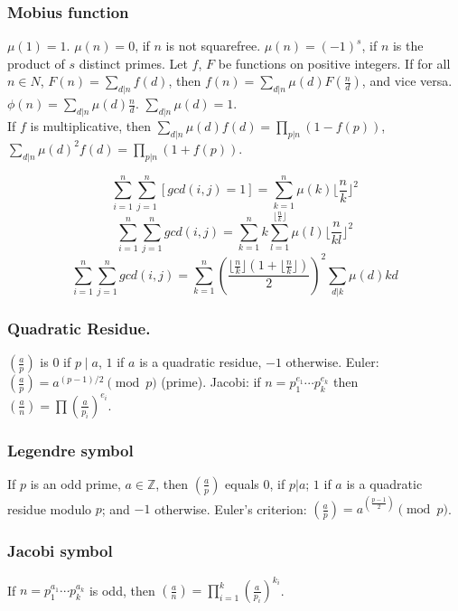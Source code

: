 \begin{small}
\subsubsection{Mobius function}
$\mu(1) = 1$. $\mu(n) = 0$, if $n$ is not squarefree.
$\mu(n) = (-1)^s$, if $n$ is the product of $s$ distinct primes.
Let $f$, $F$ be functions on positive integers.
If for all $n \in N$, $F(n)=\sum_{d|n} f(d)$, then $f(n) = \sum_{d|n} \mu(d) F(\frac{n}{d})$,
and vice versa. \quad
$\phi(n) = \sum_{d|n} \mu(d) \frac{n}{d}$.
\quad $\sum_{d|n} \mu(d) = 1$. \\
If $f$ is multiplicative, then $\sum_{d|n} \mu(d) f(d) = \prod_{p|n}(1-f(p))$,
$\sum_{d|n} \mu(d)^2 f(d) = \prod_{p|n} (1+f(p))$.
\begin{itemize}[noitemsep]
  $$ \sum_{i = 1}^n \sum_{j = 1}^n [gcd(i, j) = 1] = \sum_{k = 1}^n \mu(k) \lfloor \frac{n}{k} \rfloor^2 $$
  $$ \sum_{i = 1}^n \sum_{j = 1}^n gcd(i, j) = \sum_{k = 1}^n k \sum_{l = 1}^{\lfloor \frac{n}{k} \rfloor} \mu(l) \lfloor {\frac{n}{kl}} \rfloor^2 $$
  $$ \sum_{i = 1}^n \sum_{j = 1}^n gcd(i, j) = \sum_{k = 1}^n (\frac{\lfloor \frac{n}{k} \rfloor (1 + \lfloor \frac{n}{k} \rfloor) }{2})^2 \sum_{d | k} \mu (d) kd $$
\end{itemize}

\subsubsection{Quadratic Residue.} $(\frac{a}{p})$ is $0$ if $p\mid a$, $1$ if $a$ is a quadratic residue, $-1$ otherwise. Euler: $(\frac{a}{p})=a^{(p-1)/2}\pmod p$ (prime). Jacobi: if $n=p_1^{e_1}\cdots p_k^{e_k}$ then $(\frac{a}{n})=\prod (\frac{a}{p_i})^{e_i}$. 

\subsubsection{Legendre symbol} If $p$ is an odd prime, $a \in {\mathbb Z}$, then
$\left(\frac{a}{p}\right)$ equals $0$, if $p | a$; $1$ if $a$ is a quadratic
residue modulo $p$; and $-1$ otherwise.
Euler's criterion:
$\left(\frac{a}{p}\right)=a^{\left(\frac{p-1}{2}\right)} \pmod p$. \\
\subsubsection{Jacobi symbol}  %
If $n=p_1^{a_1} \cdots p_k^{a_k}$ is odd, then
$\left(\frac{a}{n}\right) = \prod_{i=1}^k \left(\frac{a}{p_i}\right)^{k_i}$.


\end{small}
